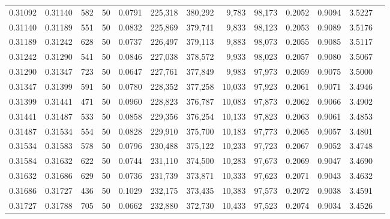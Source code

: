 \begin{tabular}{rrrrrrrrrrrrr}
0.31092 & 0.31140 &   582 &  50 &                                     0.0791 & 225,318 & 380,292 &   9,783 &  98,173 & 0.2052 & 0.9094 & 3.5227 \\
0.31140 & 0.31189 &   551 &  50 &                                     0.0832 & 225,869 & 379,741 &   9,833 &  98,123 & 0.2053 & 0.9089 & 3.5176 \\
0.31189 & 0.31242 &   628 &  50 &                                     0.0737 & 226,497 & 379,113 &   9,883 &  98,073 & 0.2055 & 0.9085 & 3.5117 \\
0.31242 & 0.31290 &   541 &  50 &                                     0.0846 & 227,038 & 378,572 &   9,933 &  98,023 & 0.2057 & 0.9080 & 3.5067 \\
0.31290 & 0.31347 &   723 &  50 &                                     0.0647 & 227,761 & 377,849 &   9,983 &  97,973 & 0.2059 & 0.9075 & 3.5000 \\
0.31347 & 0.31399 &   591 &  50 &                                     0.0780 & 228,352 & 377,258 &  10,033 &  97,923 & 0.2061 & 0.9071 & 3.4946 \\
0.31399 & 0.31441 &   471 &  50 &                                     0.0960 & 228,823 & 376,787 &  10,083 &  97,873 & 0.2062 & 0.9066 & 3.4902 \\
0.31441 & 0.31487 &   533 &  50 &                                     0.0858 & 229,356 & 376,254 &  10,133 &  97,823 & 0.2063 & 0.9061 & 3.4853 \\
0.31487 & 0.31534 &   554 &  50 &                                     0.0828 & 229,910 & 375,700 &  10,183 &  97,773 & 0.2065 & 0.9057 & 3.4801 \\
0.31534 & 0.31583 &   578 &  50 &                                     0.0796 & 230,488 & 375,122 &  10,233 &  97,723 & 0.2067 & 0.9052 & 3.4748 \\
0.31584 & 0.31632 &   622 &  50 &                                     0.0744 & 231,110 & 374,500 &  10,283 &  97,673 & 0.2069 & 0.9047 & 3.4690 \\
0.31632 & 0.31686 &   629 &  50 &                                     0.0736 & 231,739 & 373,871 &  10,333 &  97,623 & 0.2071 & 0.9043 & 3.4632 \\
0.31686 & 0.31727 &   436 &  50 &                                     0.1029 & 232,175 & 373,435 &  10,383 &  97,573 & 0.2072 & 0.9038 & 3.4591 \\
0.31727 & 0.31788 &   705 &  50 &                                     0.0662 & 232,880 & 372,730 &  10,433 &  97,523 & 0.2074 & 0.9034 & 3.4526 \\

\end{tabular}
